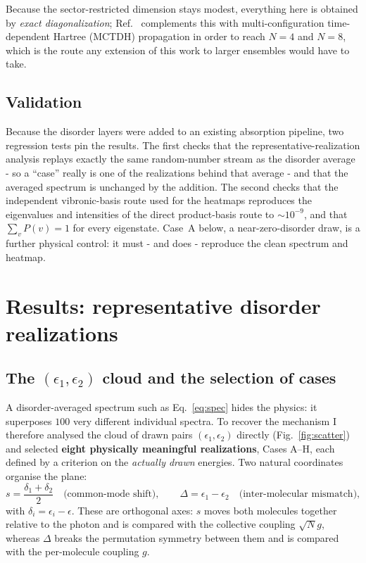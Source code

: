 \documentclass[12pt,a4paper]{article}
\begin{document}
Because the sector-restricted dimension stays modest, everything here is
obtained by \emph{exact diagonalization}; Ref.~\cite{Pandit2025} complements
this with multi-configuration time-dependent Hartree (MCTDH) propagation
\cite{Vendrell2018} in order to reach $N=4$ and $N=8$, which is the route any
extension of this work to larger ensembles would have to take.

\subsection{Validation}

Because the disorder layers were added to an existing absorption pipeline, two
regression tests pin the results. The first checks that the
representative-realization analysis replays exactly the same random-number
stream as the disorder average - so a ``case'' really is one of the
realizations behind that average - and that the averaged spectrum is
unchanged by the addition. The second checks that the independent
vibronic-basis route used for the heatmaps reproduces the eigenvalues and
intensities of the direct product-basis route to $\sim10^{-9}$, and that
$\sum_vP(v)=1$ for every eigenstate. Case~A below, a near-zero-disorder draw,
is a further physical control: it must - and does - reproduce the clean
spectrum and heatmap.

\section{Results: representative disorder realizations}\label{sec:results}

\subsection{The $(\epsilon_1,\epsilon_2)$ cloud and the selection of cases}

A disorder-averaged spectrum such as Eq.~\eqref{eq:spec} hides the physics: it
superposes $100$ very different individual spectra. To recover the mechanism I
therefore analysed the cloud of drawn pairs $(\epsilon_1,\epsilon_2)$ directly
(Fig.~\ref{fig:scatter}) and selected \textbf{eight physically meaningful
realizations}, Cases A--H, each defined by a criterion on the \emph{actually
drawn} energies. Two natural coordinates organise the plane:
\begin{equation}
  s=\frac{\delta_1+\delta_2}{2}\quad\text{(common-mode shift)},\qquad
  \Delta=\epsilon_1-\epsilon_2\quad\text{(inter-molecular mismatch)},
\end{equation}
with $\delta_i=\epsilon_i-\epsilon$. These are orthogonal axes: $s$ moves both
molecules together relative to the photon and is compared with the collective
coupling $\sqrt N g$, whereas $\Delta$ breaks the permutation symmetry between
them and is compared with the per-molecule coupling $g$.
\end{document}
